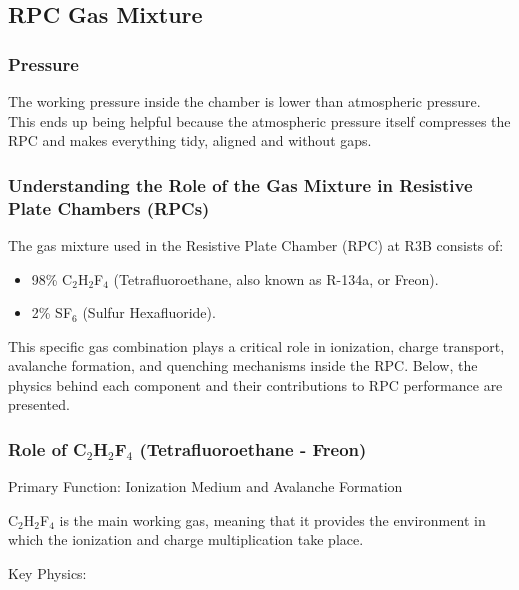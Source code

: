 \subsection{RPC Gas Mixture}

\subsubsection{Pressure}

The working pressure inside the chamber is lower than atmospheric pressure. This ends up being helpful because the atmospheric pressure itself compresses the RPC and makes everything tidy, aligned and without gaps.


\subsubsection{Understanding the Role of the Gas Mixture in Resistive Plate Chambers (RPCs)}

The gas mixture used in the Resistive Plate Chamber (RPC) at R3B consists of:

\begin{itemize}
	\item 98\% C$_2$H$_2$F$_4$ (Tetrafluoroethane, also known as R-134a, or Freon).
	\item 2\% SF$_6$ (Sulfur Hexafluoride).
\end{itemize}


This specific gas combination plays a critical role in ionization, charge transport, avalanche formation, and quenching mechanisms inside the RPC. Below, the physics behind each component and their contributions to RPC performance are presented.


\subsubsection{Role of C$_2$H$_2$F$_4$ (Tetrafluoroethane - Freon)}

Primary Function: Ionization Medium and Avalanche Formation

C$_2$H$_2$F$_4$ is the main working gas, meaning that it provides the environment in which the ionization and charge multiplication take place.

Key Physics:

